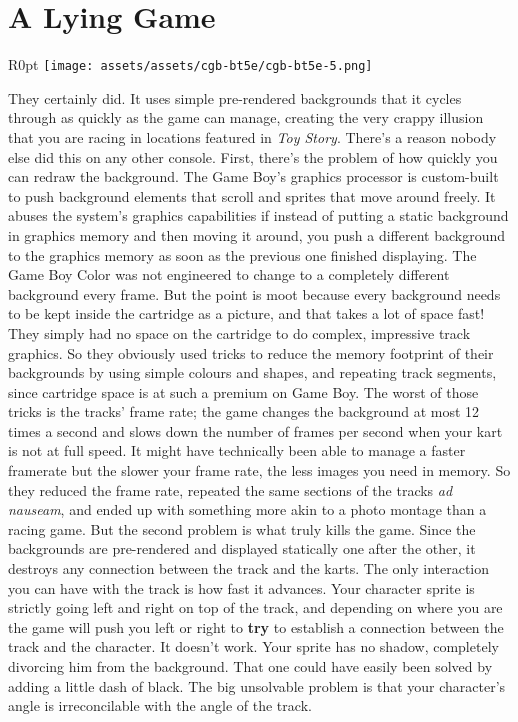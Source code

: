 \documentclass{book}
\begin{document}
\FloatBarrier\needspace{5pt}\section*{A Lying Game}\nopagebreak[4]

\begin{wrapfigure}{R}{0pt} \texttt{[image: assets/assets/cgb-bt5e/cgb-bt5e-5.png]}\end{wrapfigure}
They certainly did. It uses simple pre-rendered backgrounds that it cycles through as quickly as the game can manage, creating the very crappy illusion that you are racing in locations featured in \emph{Toy Story}. There’s a reason nobody else did this on any other console. First, there’s the problem of how quickly you can redraw the background. The Game Boy’s graphics processor is custom-built to push background elements that scroll and sprites that move around freely. It abuses the system’s graphics capabilities if instead of putting a static background in graphics memory and then moving it around, you push a different background to the graphics memory as soon as the previous one finished displaying. The Game Boy Color was not engineered to change to a completely different background every frame. But the point is moot because every background needs to be kept inside the cartridge as a picture, and that takes a lot of space fast! They simply had no space on the cartridge to do complex, impressive track graphics. So they obviously used tricks to reduce the memory footprint of their backgrounds by using simple colours and shapes, and repeating track segments, since cartridge space is at such a premium on Game Boy. The worst of those tricks is the tracks’ frame rate; the game changes the background at most 12 times a second and slows down the number of frames per second when your kart is not at full speed. It might have technically been able to manage a faster framerate but the slower your frame rate, the less images you need in memory. So they reduced the frame rate, repeated the same sections of the tracks \emph{ad nauseam}, and ended up with something more akin to a photo montage than a racing game. But the second problem is what truly kills the game. Since the backgrounds are pre-rendered and displayed statically one after the other, it destroys any connection between the track and the karts. The only interaction you can have with the track is how fast it advances. Your character sprite is strictly going left and right on top of the track, and depending on where you are the game will push you left or right to \textbf{try} to establish a connection between the track and the character. It doesn’t work. Your sprite has no shadow, completely divorcing him from the background. That one could have easily been solved by adding a little dash of black. The big unsolvable problem is that your character’s angle is irreconcilable with the angle of the track.
\end{document}

